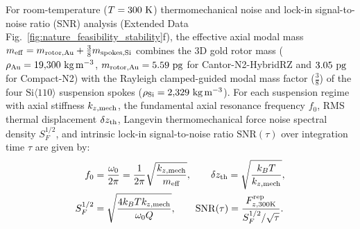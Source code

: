 \documentclass[pdflatex,sn-nature]{sn-jnl}
\DeclareRobustCommand{\roundtwo}[1]{\fpeval{round(#1,2)}}
\begin{document}
For room-temperature ($T = 300{}\text{ K}$) thermomechanical noise and lock-in signal-to-noise ratio (SNR) analysis (Extended Data Fig.~\ref{fig:nature_feasibility_stability}f), the effective axial modal mass $m_{\rm eff} = m_{\rm rotor,Au} + \frac{3}{8}m_{\rm spokes,Si}$ combines the 3D gold rotor mass ($\rho_{\rm Au} = 19{,}300\text{ kg}\,\text{m}^{-3}$, $m_{\rm rotor,Au} = \roundtwo{\NatureCantorNtwoHybridrzThermomechanicalNoiseMRotorGoldPg}\text{ pg}$ for Cantor-N2-HybridRZ and $\roundtwo{\NatureRotCeightCompactNtwoThermomechanicalNoiseMRotorGoldPg}\text{ pg}$ for Compact-N2) with the Rayleigh clamped-guided modal mass factor ($\frac{3}{8}$) of the four $\text{Si}\langle 110\rangle$ suspension spokes ($\rho_{\rm Si} = 2{,}329\text{ kg}\,\text{m}^{-3}$). For each suspension regime with axial stiffness $k_{z,\rm mech}$, the fundamental axial resonance frequency $f_0$, RMS thermal displacement $\delta z_{\rm th}$, Langevin thermomechanical force noise spectral density $S_F^{1/2}$, and intrinsic lock-in signal-to-noise ratio $\mathrm{SNR}(\tau)$ over integration time $\tau$ are given by:
\begin{equation}
\begin{aligned}
f_0 &= \frac{\omega_0}{2\pi} = \frac{1}{2\pi}\sqrt{\frac{k_{z,\rm mech}}{m_{\rm eff}}}, \qquad
\delta z_{\rm th} = \sqrt{\frac{k_B T}{k_{z,\rm mech}}}, \\
S_F^{1/2} &= \sqrt{\frac{4 k_B T k_{z,\rm mech}}{\omega_0 Q}}, \qquad
\mathrm{SNR}(\tau) = \frac{F_{z,300\rm K}^{\rm rep}}{S_F^{1/2} / \sqrt{\tau}}.
\end{aligned}
\label{eq:methods_thermomechanical_snr}
\end{equation}
\end{document}
